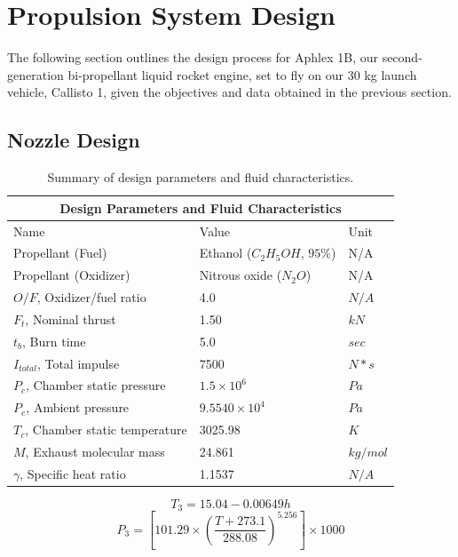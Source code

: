 \documentclass[9pt]{article} %
\numberwithin{equation}{section} %
\begin{document}
\section{Propulsion System Design}
\hspace{\parindent} The following section outlines the design process for Aphlex 1B, our second-generation bi-propellant liquid rocket engine, set to fly on our 30 kg launch vehicle, Callisto 1, given the objectives and data obtained in the previous section.

\subsection{Nozzle Design}

\begin{table}[!htb]
\centering
\begin{tabular}{ |p{6cm}||p{4cm}|p{2cm}|  }
\hline
\multicolumn{3}{|c|}{Design Parameters and Fluid Characteristics} \\
\hline
Name & Value & Unit \\
\hline
Propellant (Fuel)  &  Ethanol ($C_{2}H_{5}OH$, $95\%$)   &  N/A  \\
Propellant (Oxidizer)  &  Nitrous oxide ($N_{2}O$) & N/A  \\
$O/F$, Oxidizer/fuel ratio &  4.0  &  $N/A$ \\
$F_{t}$, Nominal thrust &  1.50 &  $kN$ \\
$t_{b}$, Burn time  &  5.0 & $sec$ \\
$I_{total}$, Total impulse & 7500 & $N * s$\\
$P_{c}$, Chamber static pressure &  $1.5 \times 10^{6}$  &  $Pa$  \\
$P_{e}$, Ambient pressure &  $9.5540 \times 10^{4}$  &  $Pa$ \\
$T_{c}$, Chamber static temperature &  3025.98  &  $K$ \\
$M$, Exhaust molecular mass &  24.861  &  $kg/mol$  \\
$\gamma$, Specific heat ratio  &  1.1537  &  $N/A$ \\
\hline
\end{tabular}
\caption{Summary of design parameters and fluid characteristics.}
\label{table:gas_parameters}
\end{table}

\begin{equation} \label{eq:ambient_temperature}
T_{3} = 15.04 - 0.00649 h 
\end{equation}
\begin{equation} \label{eq:ambient_pressure}
P_{3} = \left[101.29 \times \left( \frac{T + 273.1}{288.08} \right) ^ {5.256} \right] \times 1000
\end{equation}
\end{document}
